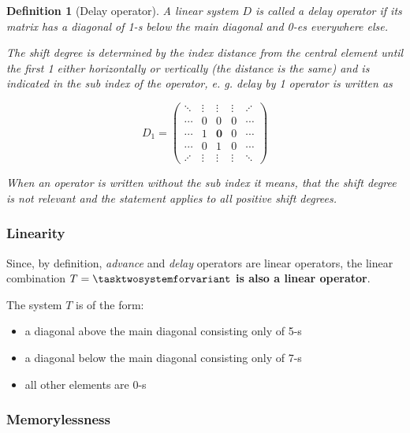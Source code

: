\documentclass[a4paper]{article}
\theoremstyle{break}
\newtheorem{definition}{Definition}[section]
\theoremstyle{break}
\begin{document}
\begin{definition}[Delay operator]
  A linear system $D$ is called a \textit{delay} operator if its matrix has a diagonal of 1-s below the main diagonal and 0-es everywhere else.

  The shift degree is determined by the index distance from the central element until the first 1 either horizontally or vertically (the distance is the same) and is indicated in the sub index of the operator, e. g. delay by 1 operator is written as

  \begin{equation*}
    D_{1} = \begin{pmatrix*}
          \ddots  & \vdots & \vdots         & \vdots & \iddots \\
          \cdots  & 0      & 0              & 0      & \cdots \\
          \cdots  & 1      & \boldsymbol{0} & 0      & \cdots \\
          \cdots  & 0      & 1              & 0      & \cdots \\
          \iddots & \vdots & \vdots         & \vdots & \ddots
        \end{pmatrix*}
  \end{equation*}

  When an operator is written without the sub index it means, that the shift degree is not relevant and the statement applies to all positive shift degrees.
\end{definition}

\subsubsection*{Linearity} \label{sssec:task-two-linearity}

Since, by definition, \textit{advance} and \textit{delay} operators are linear operators, the linear combination $T = \tasktwosystemforvariant$ \textbf{is also a linear operator}.

The system $T$ is of the form:

\begin{itemize}
  \item a diagonal above the main diagonal consisting only of 5-s
  \item a diagonal below the main diagonal consisting only of 7-s
  \item all other elements are 0-s
\end{itemize}

\subsubsection*{Memorylessness}
\end{document}
